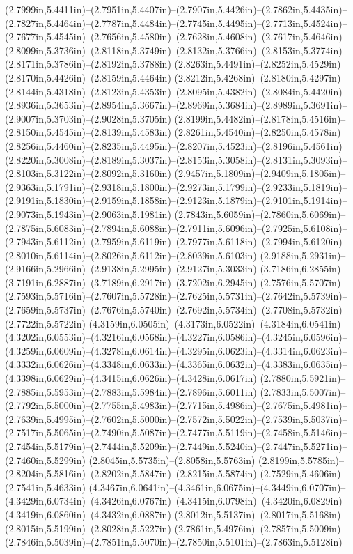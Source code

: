 (2.7999in,5.4411in)--(2.7951in,5.4407in)--(2.7907in,5.4426in)--(2.7862in,5.4435in)--(2.7827in,5.4464in)--(2.7787in,5.4484in)--(2.7745in,5.4495in)--(2.7713in,5.4524in)--(2.7677in,5.4545in)--(2.7656in,5.4580in)--(2.7628in,5.4608in)--(2.7617in,5.4646in) (2.8099in,5.3736in)--(2.8118in,5.3749in)--(2.8132in,5.3766in)--(2.8153in,5.3774in)--(2.8171in,5.3786in)--(2.8192in,5.3788in) (2.8263in,5.4491in)--(2.8252in,5.4529in) (2.8170in,5.4426in)--(2.8159in,5.4464in) (2.8212in,5.4268in)--(2.8180in,5.4297in)--(2.8144in,5.4318in)--(2.8123in,5.4353in)--(2.8095in,5.4382in)--(2.8084in,5.4420in) (2.8936in,5.3653in)--(2.8954in,5.3667in)--(2.8969in,5.3684in)--(2.8989in,5.3691in)--(2.9007in,5.3703in)--(2.9028in,5.3705in) (2.8199in,5.4482in)--(2.8178in,5.4516in)--(2.8150in,5.4545in)--(2.8139in,5.4583in) (2.8261in,5.4540in)--(2.8250in,5.4578in) (2.8256in,5.4460in)--(2.8235in,5.4495in)--(2.8207in,5.4523in)--(2.8196in,5.4561in) (2.8220in,5.3008in)--(2.8189in,5.3037in)--(2.8153in,5.3058in)--(2.8131in,5.3093in)--(2.8103in,5.3122in)--(2.8092in,5.3160in) (2.9457in,5.1809in)--(2.9409in,5.1805in)--(2.9363in,5.1791in)--(2.9318in,5.1800in)--(2.9273in,5.1799in)--(2.9233in,5.1819in)--(2.9191in,5.1830in)--(2.9159in,5.1858in)--(2.9123in,5.1879in)--(2.9101in,5.1914in)--(2.9073in,5.1943in)--(2.9063in,5.1981in) (2.7843in,5.6059in)--(2.7860in,5.6069in)--(2.7875in,5.6083in)--(2.7894in,5.6088in)--(2.7911in,5.6096in)--(2.7925in,5.6108in)--(2.7943in,5.6112in)--(2.7959in,5.6119in)--(2.7977in,5.6118in)--(2.7994in,5.6120in)--(2.8010in,5.6114in)--(2.8026in,5.6112in)--(2.8039in,5.6103in) (2.9188in,5.2931in)--(2.9166in,5.2966in)--(2.9138in,5.2995in)--(2.9127in,5.3033in) (3.7186in,6.2855in)--(3.7191in,6.2887in)--(3.7189in,6.2917in)--(3.7202in,6.2945in) (2.7576in,5.5707in)--(2.7593in,5.5716in)--(2.7607in,5.5728in)--(2.7625in,5.5731in)--(2.7642in,5.5739in)--(2.7659in,5.5737in)--(2.7676in,5.5740in)--(2.7692in,5.5734in)--(2.7708in,5.5732in)--(2.7722in,5.5722in) (4.3159in,6.0505in)--(4.3173in,6.0522in)--(4.3184in,6.0541in)--(4.3202in,6.0553in)--(4.3216in,6.0568in)--(4.3227in,6.0586in)--(4.3245in,6.0596in)--(4.3259in,6.0609in)--(4.3278in,6.0614in)--(4.3295in,6.0623in)--(4.3314in,6.0623in)--(4.3332in,6.0626in)--(4.3348in,6.0633in)--(4.3365in,6.0632in)--(4.3383in,6.0635in)--(4.3398in,6.0629in)--(4.3415in,6.0626in)--(4.3428in,6.0617in) (2.7880in,5.5921in)--(2.7885in,5.5953in)--(2.7883in,5.5984in)--(2.7896in,5.6011in) (2.7833in,5.5007in)--(2.7792in,5.5000in)--(2.7755in,5.4983in)--(2.7715in,5.4986in)--(2.7675in,5.4981in)--(2.7639in,5.4995in)--(2.7602in,5.5000in)--(2.7572in,5.5022in)--(2.7539in,5.5037in)--(2.7517in,5.5065in)--(2.7490in,5.5087in)--(2.7477in,5.5119in)--(2.7458in,5.5146in)--(2.7454in,5.5179in)--(2.7444in,5.5209in)--(2.7449in,5.5240in)--(2.7447in,5.5271in)--(2.7460in,5.5299in) (2.8045in,5.5735in)--(2.8058in,5.5763in) (2.8199in,5.5785in)--(2.8204in,5.5816in)--(2.8202in,5.5847in)--(2.8215in,5.5874in) (2.7529in,5.4606in)--(2.7541in,5.4633in) (4.3467in,6.0641in)--(4.3461in,6.0675in)--(4.3449in,6.0707in)--(4.3429in,6.0734in)--(4.3426in,6.0767in)--(4.3415in,6.0798in)--(4.3420in,6.0829in)--(4.3419in,6.0860in)--(4.3432in,6.0887in) (2.8012in,5.5137in)--(2.8017in,5.5168in)--(2.8015in,5.5199in)--(2.8028in,5.5227in) (2.7861in,5.4976in)--(2.7857in,5.5009in)--(2.7846in,5.5039in)--(2.7851in,5.5070in)--(2.7850in,5.5101in)--(2.7863in,5.5128in) 